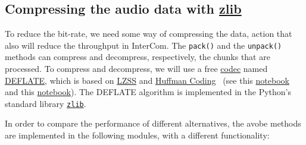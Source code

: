 \subsection{Compressing the audio data with \href{https://zlib.net/}{zlib}}
To reduce the bit-rate, we need some way of compressing the data,
action that also will reduce the throughput in InterCom. The
\verb|pack()| and the \verb|unpack()| methods can compress and
decompress, respectively, the chunks that are processed. To compress
and decompress, we will use a free
\href{https://en.wikipedia.org/wiki/Codec}{codec} named
\href{https://en.wikipedia.org/wiki/DEFLATE}{DEFLATE}, which is based
on
\href{https://en.wikipedia.org/wiki/Lempel%E2%80%93Ziv%E2%80%93Storer%E2%80%93Szymanski}{LZSS}
  and \href{https://en.wikipedia.org/wiki/Huffman_coding}{Huffman
    Coding}~\cite{nelson96datacompression} (see this
  \href{https://github.com/vicente-gonzalez-ruiz/LZ77}{notebook} and
  this
  \href{https://vicente-gonzalez-ruiz.github.io/Huffman_coding/}{notebook}). The
  DEFLATE algorithm is implemented in the Python's standard library
  \href{https://docs.python.org/3/library/zlib.html}{\texttt{zlib}}. %

In order to compare the performance of different alternatives, the
avobe methods are implemented in the following modules, with a different
functionality:

